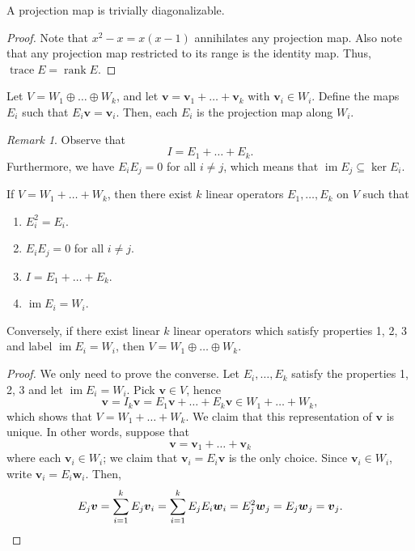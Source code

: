 \documentclass[11pt]{article}
\renewcommand{\vec}[1]{\boldsymbol{#1}}
\newcommand{\vv}{\vec{v}}
\newcommand{\vw}{\vec{w}}
\renewcommand{\ker}{\operatorname{ker}}
\newcommand{\im}{\operatorname{im}}
\newcommand{\rank}{\operatorname{rank}}
\newcommand{\trace}{\operatorname{trace}}
\theoremstyle{definition}
\theoremstyle{remark}
\newtheorem*{remark}{Remark}
\numberwithin{equation}{section}
\begin{document}
    \begin{lemma}
        A projection map is trivially diagonalizable.
    \end{lemma}
    \begin{proof}
        Note that $x^2 - x = x(x -1)$ annihilates any projection map. Also note that
        any projection map restricted to its range is the identity map. Thus,
        $\trace{E} = \rank{E}$.
    \end{proof}

    \begin{lemma}
        Let $V = W_1 \oplus \dots \oplus W_k$, and let $\vv = \vv_1 + \dots + \vv_k$
        with $\vv_i \in W_i$. Define the maps $E_i$ such that $E_i\vv = \vv_i$. Then,
        each $E_i$ is the projection map along $W_i$.
        \begin{remark}
            Observe that \[
                I = E_1 + \dots + E_k.
            \] Furthermore, we have $E_iE_j = 0$ for all $i \neq j$, which means that
            $\im{E_j} \subseteq \ker{E_i}$.
        \end{remark}
    \end{lemma}

    \begin{theorem}\label{thm:direct_sum_proj}
        If $V = W_1 + \dots + W_k$, then there exist $k$ linear operators $E_1,
        \dots, E_k$ on $V$ such that 
        \begin{enumerate}
            \itemsep0em
            \item $E_i^2 = E_i$.
            \item $E_iE_j = 0$ for all $i \neq j$.
            \item $I = E_1 + \dots + E_k$.
            \item $\im{E_i} = W_i$.
        \end{enumerate}
        Conversely, if there exist linear $k$ linear operators which satisfy
        properties 1, 2, 3 and label $\im{E_i} = W_i$, then $V = W_1 \oplus \dots
        \oplus W_k$.
    \end{theorem}
    \begin{proof}
        We only need to prove the converse. Let $E_i, \dots, E_k$ satisfy the
        properties 1, 2, 3 and let $\im{E_i} = W_i$. Pick $\vv\in V$, hence \[
            \vv = I_k\vv = E_1\vv + \dots + E_k\vv \in W_1 + \dots + W_k,
        \] which shows that $V = W_1 + \dots + W_k$. We claim that this
        representation of $\vv$ is unique. In other words, suppose that \[
            \vv = \vv_1 + \dots + \vv_k
        \] where each $\vv_i \in W_i$; we claim that $\vv_i = E_i\vv$ is the only
        choice. Since $\vv_i \in W_i$, write $\vv_i = E_i\vw_i$. Then, \[
            E_j\vv = \sum_{i = 1}^k E_j \vv_i = \sum_{i = 1}^k E_j E_i\vw_i =
            E_j^2\vw_j = E_j\vw_j = \vv_j. \qedhere
        \] 
    \end{proof}
\end{document}

